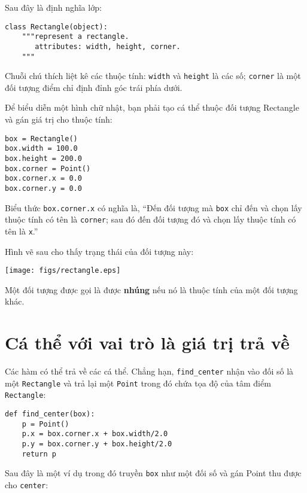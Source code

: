 \documentclass[11pt]{book}
\begin{document}

Sau đây là định nghĩa lớp:

\beforeverb
\begin{verbatim}
class Rectangle(object):
    """represent a rectangle. 
       attributes: width, height, corner.
    """
\end{verbatim}
\afterverb
%
Chuỗi chú thích liệt kê các thuộc tính: {\tt width} và
{\tt height} là các số; {\tt corner} là một đối tượng điểm
chỉ định đỉnh góc trái phía dưới.

Để biểu diễn một hình chữ nhật, bạn phải tạo cá thể thuộc đối tượng Rectangle
và gán giá trị cho thuộc tính:

\beforeverb
\begin{verbatim}
box = Rectangle()
box.width = 100.0
box.height = 200.0
box.corner = Point()
box.corner.x = 0.0
box.corner.y = 0.0
\end{verbatim}
\afterverb
%
Biểu thức {\tt box.corner.x} có nghĩa là,
``Đến đối tượng mà {\tt box} chỉ đến và chọn lấy thuộc tính có tên là
{\tt corner}; sau đó đến đối tượng đó và chọn lấy thuộc tính có tên là 
{\tt x}.''

Hình vẽ sau cho thấy trạng thái của đối tượng này:


\beforefig
\centerline{\texttt{[image: figs/rectangle.eps]}}
\afterfig

Một đối tượng được gọi là được {\bf nhúng} nếu nó là thuộc tính của một đối tượng khác.



\section{Cá thể với vai trò là giá trị trả về}


Các hàm có thể trả về các cá thể. Chẳng hạn, \verb"find_center"
nhận vào đối số là một {\tt Rectangle} và trả lại một {\tt Point}
trong đó chứa tọa độ của tâm điểm {\tt Rectangle}:

\beforeverb
\begin{verbatim}
def find_center(box):
    p = Point()
    p.x = box.corner.x + box.width/2.0
    p.y = box.corner.y + box.height/2.0
    return p
\end{verbatim}
\afterverb
%
Sau đây là một ví dụ trong đó truyền {\tt box} như một đối số và gán 
Point thu được cho {\tt center}:
\end{document}
